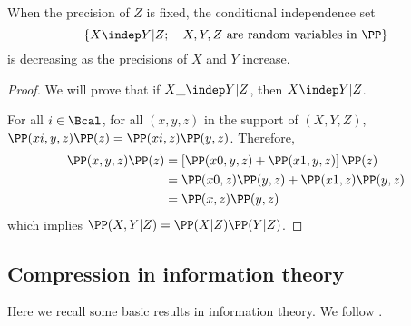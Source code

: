 \begin{lemma}
    When the precision of $Z$ is fixed, the conditional independence set 
    $$\{X \indep Y | Z ; \quad X,Y,Z { \text{ are random variables in } \PP}\}$$
    is decreasing as the precisions of $X$ and $Y$ increase. 
\end{lemma}

\begin{proof}
    We will prove that if $X\_\indep Y|Z$, then $X\indep Y|Z$. 
    
    For all $i\in \Bcal$, for all $(x,y,z)$ in the support of $(X,Y,Z)$, $\PP(xi,y,z)\PP(z) = \PP(xi,z)\PP(y,z)$. Therefore,
    \begin{align}
         \PP(x,y,z)\PP(z) &= \left[ \PP(x0,y,z) + \PP(x1,y,z) \right] \PP(z)\\
         &= \PP(x0,z)\PP(y,z) + \PP(x1,z)\PP(y,z)\\
         & = \PP(x,z)\PP(y,z)
    \end{align}
    which implies $\PP(X,Y|Z)=\PP(X|Z)\PP(Y|Z)$.
\end{proof}

\subsection{Compression in information theory}\label{sec:comment_entropy}
Here we recall some basic results in information theory. We follow \cite{cover1999elements}.

